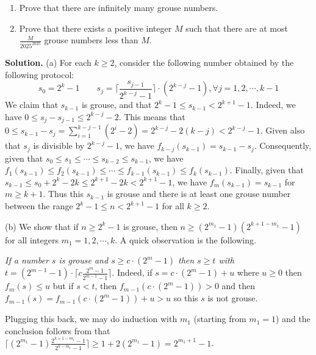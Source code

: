 \documentclass[11pt,a4paper]{article}
\begin{document}
\begin{enumerate}
    	\begin{enumerate}
    		\item [(a)]  Prove that there are infinitely many grouse numbers.
    		
    		\item [(b)] Prove that there exists a positive integer $M$ such that there are at most $\frac{M}{2025^{2025}}$ grouse numbers less than $M$.
    	\end{enumerate}
    	
    	\textbf{Solution.} 
    	(a) 
    	For each $k\ge 2$, consider the following number obtained by the following protocol: 
    	\[
    	s_0 = 2^{k}-1
    	\qquad 
    	s_j = \lceil\frac{s_{j-1}}{2^{k - j} - 1} \rceil \cdot (2^{k - j} - 1), 
    	\forall j = 1, 2, \cdots, k - 1
    	\]
    	We claim that $s_{k-1}$ is grouse, 
    	and that $2^k - 1\le s_{k-1} < 2^{k+1}-1$. 
    	Indeed, we have $0\le s_j - s_{j-1}\le 2^{k - j} - 2$. 
    	This means that $0\le s_{k - 1} - s_j = \sum_{i=1}^{k - j - 1} (2^{i} - 2) = 2^{k - j} - 2(k - j) < 2^{k - j} - 1$. 
    	Given also that $s_j$ is divisible by $2^{k - j} - 1$, 
    	we have $f_{k - j}(s_{k-1}) = s_{k - 1} - s_j$. 
    	Consequently, given that $s_0\le s_1\le \cdots \le s_{k - 2}\le s_{k-1}$, 
    	we have $f_1(s_{k-1})\le f_2(s_{k-1})\le \cdots \le f_{k-1}(s_{k-1})\le f_k(s_{k-1})$. 
    	Finally, given that $s_{k-1}\le s_0 + 2^k - 2k \le 2^{k+1} - 2k < 2^{k+1}-1$, 
    	we have $f_m(s_{k-1}) = s_{k-1}$ for $m\ge k + 1$. 
    	Thus this $s_{k-1}$ is grouse and there is at least one grouse number between the range $2^k - 1\le n < 2^{k+1}-1$ for all $k\ge 2$. 
    	
    	 (b) We show that if $n\ge 2^k - 1$ is grouse, then $n\ge (2^{m_1} - 1)(2^{k + 1 - m_1}-1)$ for all integers $m_1=1, 2, \cdots, k$. 
    	 A quick observation is the following. 
    	 
    	 \textit{If a number $s$ is grouse and $s\ge c\cdot (2^m-1)$ then $s\ge t$ with $t=(2^{m-1}-1)\cdot \lceil c\frac{2^m-1}{2^{m-1}-1}\rceil$}. 
    	 Indeed, if $s = c\cdot (2^m-1) + u$ where $u\ge 0$ then $f_m(s)\le u$ but if $s < t$, 
    	 then $f_{m-1}(c\cdot (2^m-1)) > 0$ and 
    	 then $f_{m-1}(s) = f_{m-1}(c\cdot (2^m-1)) + u > u$ so this $s$ is not grouse. 
    	 
    	 Plugging this back, we may do induction with $m_1$ (starting from $m_1=1$) and the conclusion follows from that 
    	 $\lceil (2^{m_1}-1)\frac{2^{k+1-m_1}-1}{2^{k-m_1}-1}\rceil\ge 1 + 2(2^{m_1}-1)=2^{m_1+1}-1$. 
    	 

\end{enumerate}
\end{document}
